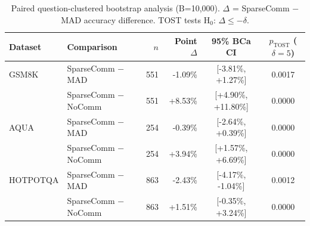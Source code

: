 \begin{table}[t]
\centering
\caption{Paired question-clustered bootstrap analysis (B=10{,}000). $\Delta$ = SparseComm $-$ MAD accuracy difference. TOST tests H$_0$: $\Delta \leq -\delta$.}
\label{tab:bootstrap}
\small
\begin{tabular}{llrrcc}
\toprule
Dataset & Comparison & $n$ & Point $\Delta$ & 95\% BCa CI & $p_{\text{TOST}}$ ($\delta\!=\!5$) \\
\midrule
  GSM8K & SparseComm − MAD & 551 & -1.09\% & [-3.81\%, +1.27\%] & 0.0017 \\
   & SparseComm − NoComm & 551 & +8.53\% & [+4.90\%, +11.80\%] & 0.0000 \\
  AQUA & SparseComm − MAD & 254 & -0.39\% & [-2.64\%, +0.39\%] & 0.0000 \\
   & SparseComm − NoComm & 254 & +3.94\% & [+1.57\%, +6.69\%] & 0.0000 \\
  HOTPOTQA & SparseComm − MAD & 863 & -2.43\% & [-4.17\%, -1.04\%] & 0.0012 \\
   & SparseComm − NoComm & 863 & +1.51\% & [-0.35\%, +3.24\%] & 0.0000 \\
\bottomrule
\end{tabular}
\end{table}